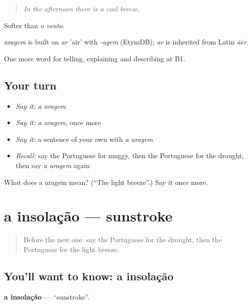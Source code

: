 \begin{quote}
\emph{In the afternoon there is a cool breeze.}
\end{quote}

Softer than \emph{o vento}.

\begin{cousinweb}
\emph{aragem} is built on \emph{ar} 'air' with \emph{-agem} (EtymDB); \emph{ar} is inherited from Latin \emph{āēr}.
\end{cousinweb}

\begin{grammarlens}[title={What you've built}]
One more word for telling, explaining and describing at B1.
\end{grammarlens}

\subsection*{Your turn}
\begin{itemize}
\raggedright
  \item \emph{Say it:} \emph{a aragem}
  \item \emph{Say it:} \emph{a aragem}, once more
  \item \emph{Say it:} a sentence of your own with \emph{a aragem}
  \item \emph{Recall:} say the Portuguese for muggy, then the Portuguese for the drought, then say \emph{a aragem} again
\end{itemize}

\begin{tcolorbox}[breakable,colback=teal!4,colframe=teal!35!black,title={Before you move on}]
What does a aragem mean? (\textquotedblleft{}The light breeze\textquotedblright{}.) Say it once more.
\end{tcolorbox}
\section[a insolação]{a insolação — sunstroke}

\label{lesson:PT-C462-insolacao}



\begin{quote}
Before the new one: say the Portuguese for the drought, then the Portuguese for the light breeze.
\end{quote}

\subsection*{You'll want to know: a insolação}
\textbf{a insolação} — \textquotedblleft{}sunstroke\textquotedblright{}.


